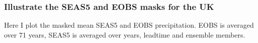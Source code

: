 \documentclass[letterpaper,10pt,english]{sphinxmanual}
\begin{document}
{
\begin{sphinxVerbatim}[commandchars=\\\{\}]
\llap{\color{nbsphinxin}[59]:\,\hspace{\fboxrule}\hspace{\fboxsep}}
\end{sphinxVerbatim}
}


\subsubsection{Illustrate the SEAS5 and EOBS masks for the UK}
\label{\detokenize{Notebooks/2.Preprocess/2.Preprocess:Illustrate-the-SEAS5-and-EOBS-masks-for-the-UK}}
Here I plot the masked mean SEAS5 and EOBS precipitation. EOBS is averaged over 71 years, SEAS5 is averaged over years, leadtime and ensemble members.
\end{document}

